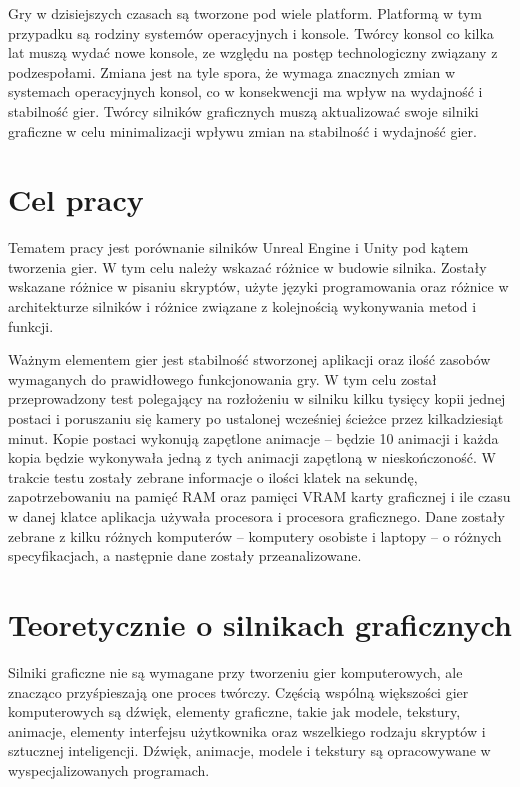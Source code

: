 \documentclass[12pt,twoside]{article}
\begin{document}
Gry w dzisiejszych czasach są tworzone pod wiele platform. Platformą w tym
przypadku są rodziny systemów operacyjnych i konsole. Twórcy konsol co kilka lat
muszą wydać nowe konsole, ze względu na postęp technologiczny związany z
podzespołami. Zmiana jest na tyle spora, że wymaga znacznych zmian w systemach
operacyjnych konsol, co w konsekwencji ma wpływ na wydajność i stabilność gier.
Twórcy silników graficznych muszą aktualizować swoje silniki graficzne w celu
minimalizacji wpływu zmian na stabilność i wydajność gier. 



\clearpage

\section{Cel pracy}

Tematem pracy jest porównanie silników Unreal Engine i Unity pod kątem tworzenia
gier.  W tym celu należy wskazać różnice w budowie silnika. Zostały wskazane
różnice w pisaniu skryptów,  użyte języki programowania oraz różnice w
architekturze silników i różnice związane z kolejnością wykonywania metod i
funkcji. 


Ważnym elementem gier jest stabilność stworzonej aplikacji oraz ilość zasobów
wymaganych do prawidłowego funkcjonowania gry. W tym celu został przeprowadzony
test polegający na rozłożeniu w silniku kilku tysięcy kopii jednej postaci i
poruszaniu się kamery po ustalonej wcześniej ścieżce przez kilkadziesiąt minut.
Kopie postaci wykonują zapętlone animacje -- będzie 10 animacji i każda kopia
będzie wykonywała jedną z tych animacji zapętloną w nieskończoność. W trakcie
testu zostały zebrane informacje o ilości klatek na sekundę,
zapotrzebowaniu na pamięć RAM oraz pamięci VRAM karty graficznej i ile czasu w danej klatce
aplikacja używała procesora i procesora graficznego. Dane zostały zebrane z
kilku różnych komputerów -- komputery osobiste i laptopy -- o różnych
specyfikacjach, a następnie dane zostały przeanalizowane. 


\clearpage


\section{Teoretycznie o silnikach graficznych}

Silniki graficzne nie są wymagane przy tworzeniu gier komputerowych, ale
znacząco przyśpieszają one proces twórczy. Częścią wspólną większości gier
komputerowych są dźwięk, elementy graficzne, takie jak modele, tekstury,
animacje, elementy interfejsu użytkownika oraz wszelkiego rodzaju skryptów i
sztucznej inteligencji. Dźwięk, animacje, modele i tekstury są opracowywane w
wyspecjalizowanych programach. 
\end{document}
